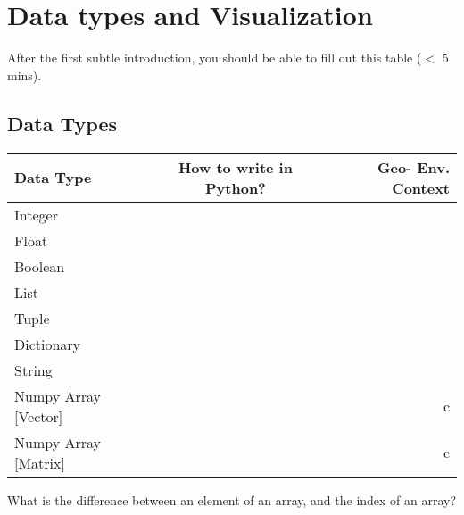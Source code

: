
\section{Data types and Visualization}
After the first subtle introduction, you should be able to fill out this table ($<$ 5 mins).
\subsection{Data Types}

    \begin{center}
    
      \label{tab:table1}
      \begin{tabular}{l|c|r} %
        \textbf{Data Type} & \textbf{How to write in Python?} & \textbf{Geo- Env. Context}\\
        \hline
        Integer &  & \\
        Float &  & \\
        Boolean &  & \\
        List &  & \\
        Tuple &  & \\
        Dictionary &  & \\
        String &  & \\
        Numpy Array [Vector] &  & c\\
        Numpy Array [Matrix] &  & c\\
      \end{tabular}
    \end{center}
    What is the difference between an element of an array, and the index of an array?
  \ifanswers
